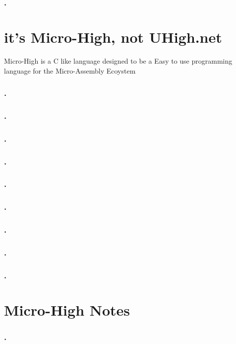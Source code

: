\documentclass[a4paper,11pt]{book}
\begin{document}
\subsection{.}

\chapter{it's Micro-High, not UHigh.net}

Micro-High is a C like language designed to be a Easy to use programming language for the 
Micro-Assembly Ecoystem

\subsection{.}
\subsection{.}
\subsection{.}
\subsection{.}
\subsection{.}
\subsection{.}
\subsection{.}
\subsection{.}
\subsection{.}

\chapter{Micro-High Notes}

\subsection{.}
\end{document}

